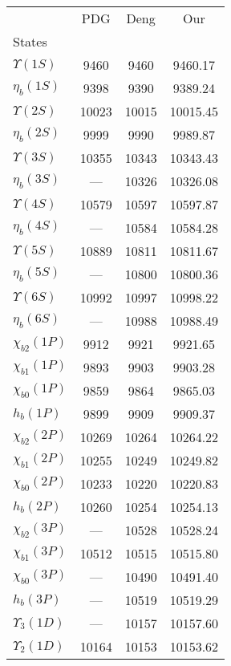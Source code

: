\begin{tabular}{lccc}
\toprule
{} &    PDG &   Deng &       Our \\
States             &        &        &           \\
\midrule
$\Upsilon(1S)$     &   9460 &   9460 &   9460.17 \\
$\eta_{b}(1S)$     &   9398 &   9390 &   9389.24 \\
$\Upsilon(2S)$     &  10023 &  10015 &  10015.45 \\
$\eta_{b}(2S)$     &   9999 &   9990 &   9989.87 \\
$\Upsilon(3S)$     &  10355 &  10343 &  10343.43 \\
$\eta_{b}(3S)$     &      — &  10326 &  10326.08 \\
$\Upsilon(4S)$     &  10579 &  10597 &  10597.87 \\
$\eta_{b}(4S)$     &      — &  10584 &  10584.28 \\
$\Upsilon(5S)$     &  10889 &  10811 &  10811.67 \\
$\eta_{b}(5S)$     &      — &  10800 &  10800.36 \\
$\Upsilon(6S)$     &  10992 &  10997 &  10998.22 \\
$\eta_{b}(6S)$     &      — &  10988 &  10988.49 \\
$\chi_{b2}(1P)$    &   9912 &   9921 &   9921.65 \\
$\chi_{b1}(1P)$    &   9893 &   9903 &   9903.28 \\
$\chi_{b0}(1P)$    &   9859 &   9864 &   9865.03 \\
$h_{b}(1P)$        &   9899 &   9909 &   9909.37 \\
$\chi_{b2}(2P)$    &  10269 &  10264 &  10264.22 \\
$\chi_{b1}(2P)$    &  10255 &  10249 &  10249.82 \\
$\chi_{b0}(2P)$    &  10233 &  10220 &  10220.83 \\
$h_{b}(2P)$        &  10260 &  10254 &  10254.13 \\
$\chi_{b2}(3P)$    &      — &  10528 &  10528.24 \\
$\chi_{b1}(3P)$    &  10512 &  10515 &  10515.80 \\
$\chi_{b0}(3P)$    &      — &  10490 &  10491.40 \\
$h_{b}(3P)$        &      — &  10519 &  10519.29 \\
$\Upsilon_{3}(1D)$ &      — &  10157 &  10157.60 \\
$\Upsilon_{2}(1D)$ &  10164 &  10153 &  10153.62 \\

\end{tabular}

